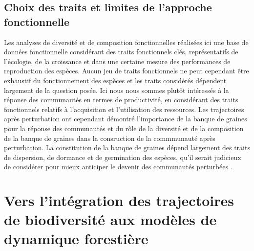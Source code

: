 \documentclass[
  11pt,
  french,
  A4paper,
  extrafontsizes,onecolumn,openright
  ]{memoir}
\begin{document}
\subsection{Choix des traits et limites de l'approche
fonctionnelle}\label{choix-des-traits-et-limites-de-lapproche-fonctionnelle}

Les analyses de diversité et de composition fonctionnelles réalisées ici
une base de données fonctionnelle considérant des traits fonctionnels
clés, représentatifs de l'écologie, de la croissance et dans une
certaine mesure des performances de reproduction des espèces. Aucun jeu
de traits fonctionnels ne peut cependant être exhaustif du
fonctionnement des espèces et les traits considérés dépendent largement
de la question posée. Ici nous nous sommes plutôt intéressés à la
réponse des communautés en termes de productivité, en considérant des
traits fonctionnels relatifs à l'acquisition et l'utilisation des
ressources. Les trajectoires après perturbation ont cependant démontré
l'importance de la banque de graines pour la réponse des communautés et
du rôle de la diversité et de la composition de la banque de graines
dans la consruction de la commmunauté après perturbation. La
constitution de la banque de graines dépend largement des traits de
dispersion, de dormance et de germination des espèces, qu'il serait
judicieux de considérer pour mieux anticiper le devenir des communautés
perturbées \autocites{Verdu2005}{Yguel_inprep}.

\section{Vers l'intégration des trajectoires de biodiversité aux modèles
de dynamique
forestière}\label{vers-lintegration-des-trajectoires-de-biodiversite-aux-modeles-de-dynamique-forestiere}
\end{document}

